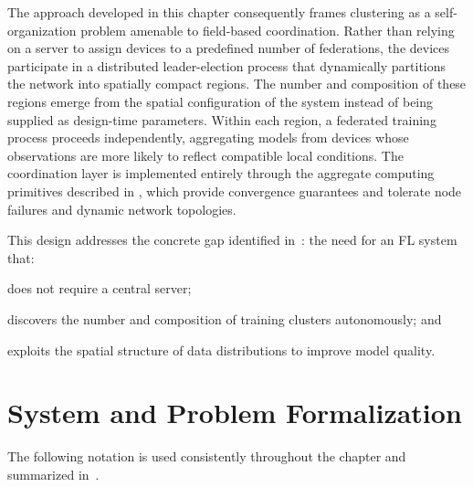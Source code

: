 The approach developed in this chapter consequently frames clustering
 as a self-organization problem amenable to field-based coordination.
%
Rather than relying on a server to assign devices 
 to a predefined number of federations,
 the devices participate in a distributed leader-election process that
 dynamically partitions the network into spatially compact regions.
%
The number and composition of these regions emerge from the spatial
 configuration of the system instead of being supplied as design-time
 parameters.
%
Within each region, 
 a federated training process proceeds independently, 
 aggregating models from devices whose observations are more likely to
 reflect compatible local conditions.
%
The coordination layer is implemented entirely through 
 the aggregate computing primitives described in ,
 which provide convergence guarantees and tolerate node failures 
 and dynamic network topologies.

This design addresses the concrete gap identified in~:
 the need for an \gls{FL} system that:
 \begin{enumerate*}[label=(\roman*)]
  \item does not require a central server;
  \item discovers the number and composition of training clusters autonomously; and
  \item exploits the spatial structure of data distributions to improve model quality.
 \end{enumerate*}


\section{System and Problem Formalization}
\label{sec:selforgfl-formalization}

The following notation is used consistently throughout the chapter
 and summarized in~.

